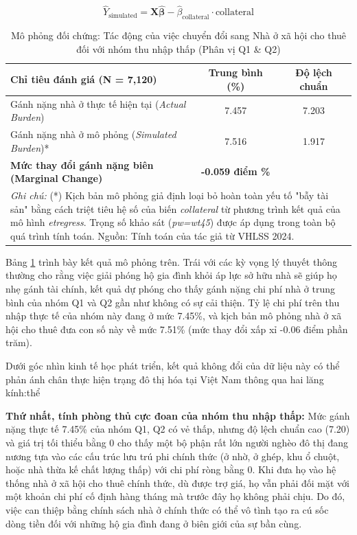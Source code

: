 \documentclass[12pt,a4paper]{report}
\begin{document}
\[
\widehat{Y}_{\text{simulated}}
=
\mathbf{X}\hat{\boldsymbol{\beta}}
-
\hat{\beta}_{\text{collateral}} \cdot \text{collateral}
\]

\begin{table}[htbp]
	\centering
	\caption{Mô phỏng đối chứng: Tác động của việc chuyển đổi sang Nhà ở xã hội cho thuê đối với nhóm thu nhập thấp (Phân vị Q1 \& Q2)}
	\label{tab:policy_simulation}
	\renewcommand{\arraystretch}{1.3}
	\begin{tabular}{lcc}
		\toprule
		\textbf{Chỉ tiêu đánh giá (N = 7,120)} & \textbf{Trung bình (\%)} & \textbf{Độ lệch chuẩn} \\
		\midrule
		Gánh nặng nhà ở thực tế hiện tại (\textit{Actual Burden}) & 7.457 & 7.203 \\
		Gánh nặng nhà ở mô phỏng (\textit{Simulated Burden})* & 7.516 & 1.917 \\
		\midrule
		\textbf{Mức thay đổi gánh nặng biên (Marginal Change)} & \textbf{-0.059 điểm \%} & \\
		\bottomrule
		\multicolumn{3}{p{12cm}}{\footnotesize \textit{Ghi chú:} (*) Kịch bản mô phỏng giả định loại bỏ hoàn toàn yếu tố "bẫy tài sản" bằng cách triệt tiêu hệ số của biến \textit{collateral} từ phương trình kết quả của mô hình \textit{etregress}. Trọng số khảo sát (\textit{pw=wt45}) được áp dụng trong toàn bộ quá trình tính toán. Nguồn: Tính toán của tác giả từ VHLSS 2024.}
	\end{tabular}
\end{table}

Bảng \ref{tab:policy_simulation} trình bày kết quả mô phỏng trên. Trái với các kỳ vọng lý thuyết thông thường cho rằng việc giải phóng hộ gia đình khỏi áp lực sở hữu nhà sẽ giúp họ nhẹ gánh tài chính, kết quả dự phóng cho thấy gánh nặng chi phí nhà ở trung bình của nhóm Q1 và Q2 gần như không có sự cải thiện. Tỷ lệ chi phí trên thu nhập thực tế của nhóm này đang ở mức 7.45\%, và kịch bản mô phỏng nhà ở xã hội cho thuê đưa con số này về mức 7.51\% (mức thay đổi xấp xỉ -0.06 điểm phần trăm).

Dưới góc nhìn kinh tế học phát triển, kết quả không đổi của dữ liệu này có thể phản ánh chân thực hiện trạng đô thị hóa tại Việt Nam thông qua hai lăng kính:thể

\textbf{Thứ nhất, tính phòng thủ cực đoan của nhóm thu nhập thấp:} Mức gánh nặng thực tế 7.45\% của nhóm Q1, Q2 có vẻ thấp, nhưng độ lệch chuẩn cao (7.20) và giá trị tối thiểu bằng 0 cho thấy một bộ phận rất lớn người nghèo đô thị đang nương tựa vào các cấu trúc lưu trú phi chính thức (ở nhờ, ở ghép, khu ổ chuột, hoặc nhà thừa kế chất lượng thấp) với chi phí ròng bằng 0. Khi đưa họ vào hệ thống nhà ở xã hội cho thuê chính thức, dù được trợ giá, họ vẫn phải đối mặt với một khoản chi phí cố định hàng tháng mà trước đây họ không phải chịu. Do đó, việc can thiệp bằng chính sách nhà ở chính thức có thể vô tình tạo ra cú sốc dòng tiền đối với những hộ gia đình đang ở biên giới của sự bần cùng.
\end{document}
